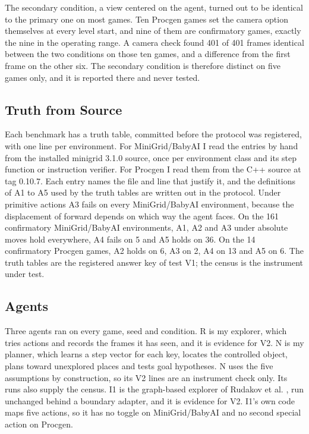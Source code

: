 \documentclass[twocolumn]{svjour3}
\begin{document}
The secondary condition, a view centered on the agent, turned out to be
identical to the primary one on most games. Ten Procgen games set the
camera option themselves at every level start, and nine of them are
confirmatory games, exactly the nine in the operating range. A camera
check found 401 of 401 frames identical between the two conditions on
those ten games, and a difference from the first frame on the other six.
The secondary condition is therefore distinct on five games only, and it
is reported there and never tested.

\subsection{Truth from Source}\label{sec:truth}

Each benchmark has a truth table, committed before the protocol was
registered, with one line per environment. For MiniGrid/BabyAI I read
the entries by hand from the installed minigrid 3.1.0 source, once per
environment class and its step function or instruction verifier. For
Procgen I read them from the C++ source at tag 0.10.7. Each entry names
the file and line that justify it, and the definitions of A1 to A5 used
by the truth tables are written out in the protocol. Under primitive
actions A3 fails on every MiniGrid/BabyAI environment, because the
displacement of forward depends on which way the agent faces. On the 161
confirmatory MiniGrid/BabyAI environments, A1, A2 and A3 under absolute
moves hold everywhere, A4 fails on 5 and A5 holds on 36. On the 14
confirmatory Procgen games, A2 holds on 6, A3 on 2, A4 on 13 and A5 on
6. The truth tables are the registered answer key of test V1; the census
is the instrument under test.

\subsection{Agents}\label{sec:agents}

Three agents ran on every game, seed and condition. R is my explorer,
which tries actions and records the frames it has seen, and it is
evidence for V2. N is my planner, which learns a step vector for each
key, locates the controlled object, plans toward unexplored places and
tests goal hypotheses. N uses the five assumptions by construction, so
its V2 lines are an instrument check only. Its runs also supply the
census. I1 is the graph-based explorer of Rudakov et al.
\citep{rudakov2025graph}, run unchanged behind a boundary adapter, and
it is evidence for V2. I1's own code maps five actions, so it has no
toggle on MiniGrid/BabyAI and no second special action on Procgen.
\end{document}
